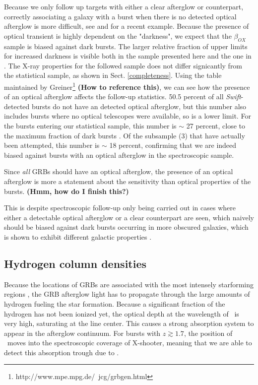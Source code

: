 \documentclass{aa}    %
\newcommand\todo[1]{\textbf{(#1)}}
\begin{document}
Because we only follow up targets with either a clear afterglow or counterpart,
correctly associating a galaxy with a burst when there is no detected optical
afterglow is more difficult, see \citet{Levesque2010} and \citet{Perley2017} for
a recent example. Because the presence of optical transient is highly dependent
on the "darkness", we expect that the $\beta_{OX}$ sample is biased against dark
bursts. The larger relative fraction of upper limits for increased darkness is
visible both in the sample presented here and the one in \citet{Fynbo2009}. The
X-ray properties for the followed sample does not differ signicantly from the
statistical sample, as shown in Sect. \ref{completeness}. Using the table
maintained by Greiner\footnote{http://www.mpe.mpg.de/~jcg/grbgen.html} \todo{How
to reference this}, we can see how the presence of an optical afterglow affects
the follow-up statistics. 50.5 percent of all \textit{Swift}-detected bursts do
not have an detected optical afterglow, but this number also includes bursts
where no optical telescopes were available, so is a lower limit. For the bursts
entering our statistical sample, this number is $\sim$ 27 percent, close to the
maximum fraction of dark bursts \citep{Melandri2012}. Of the subsample (3) that
have actually been attempted, this number is $\sim$ 18 percent, confirming that
we are indeed biased against bursts with an optical afterglow in the
spectroscopic sample.

Since \textit{all} GRBs should have an optical afterglow, the presence of an optical afterglow is more a statement about the sensitivity than optical properties of the bursts. \todo{Hmm, how do I finish this?}


This is despite spectroscopic
follow-up only being carried out in cases where either a detectable optical
afterglow or a clear counterpart are seen, which naively should be biased
against dark bursts occurring in more obscured galaxies, which is shown to
exhibit different galactic properties \citep{Perley2009, Kruhler2011, Rossi2012,
	Perley2013b, Perley2015b}.


\subsection{Hydrogen column densities}

Because the locations of GRBs are associated with the most intensely starforming
regions \citep{Hogg1999, Bloom2002, Fruchter2006}, the GRB afterglow light has
to propagate through the large amounts of hydrogen fueling the star formation.
Because a significant fraction of the hydrogen has not been ionized yet, the
optical depth at the wavelength of \lya~is very high, saturating at the line
center. This causes a strong absorption system to appear in the afterglow
continuum. For bursts with $z \gtrsim 1.7$, the position of \lya~moves into the
spectroscopic coverage of X-shooter, meaning that we are able to detect this
absorption trough due to \lya.
\end{document}
